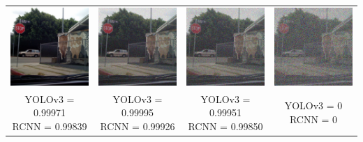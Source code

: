 \documentclass{article}
\begin{document}
\begin{center}
\begin{tabular}{ c c c c }
    \includegraphics[width=0.2\linewidth]{../test_images/stop3.png} & \includegraphics[width=0.2\linewidth]{../test_images/perturbed/stop3_noise_100.png} & \includegraphics[width=0.2\linewidth]{../test_images/perturbed/stop3_noise_200.png} & \includegraphics[width=0.2\linewidth]{../test_images/perturbed/stop3_noise_500.png} \\
    \makecell{YOLOv3 = 0.99971 \\ RCNN = 0.99839} & \makecell{YOLOv3 = 0.99995 \\ RCNN = 0.99926} & \makecell{YOLOv3 = 0.99951 \\ RCNN = 0.99850} & \makecell{YOLOv3 = 0 \\ RCNN = 0} \\  
\end{tabular}
\end{center}
\end{document}

